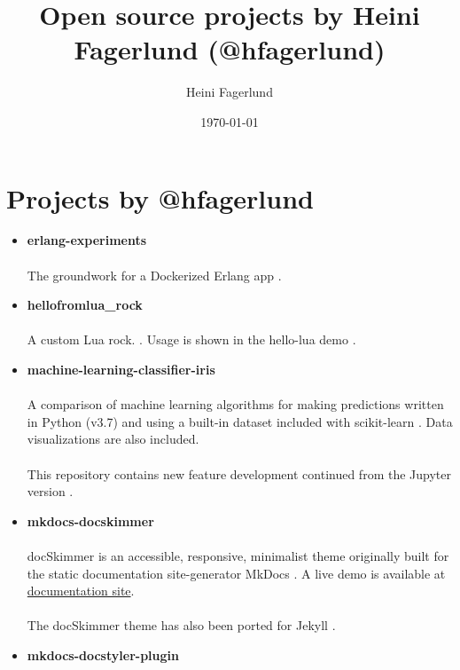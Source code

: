 \documentclass[11pt]{article}
\author{Heini Fagerlund}
\date{\today}
\title{Open source projects by Heini Fagerlund (@hfagerlund)}
\begin{document}
\maketitle

\section{Projects by @hfagerlund}
\label{sec:orgf2749c5}
\begin{itemize}
\item \textbf{erlang-experiments}
\paragraph{}
The groundwork for a Dockerized Erlang app \cite{erlang}.
\item \textbf{hellofromlua\_rock}
\paragraph{}
A custom Lua rock. \cite{luarock}. Usage is shown in the hello-lua demo \cite{lua}.
\item \textbf{machine-learning-classifier-iris}
\paragraph{}
A comparison of machine learning algorithms for making predictions written in Python (v3.7) and using a built-in dataset included with scikit-learn \cite{machinelearning}. Data visualizations are also included.
 \paragraph{}
This repository contains new feature development continued from the Jupyter version \cite{jupyter}.
\item \textbf{mkdocs-docskimmer}
\paragraph{}
docSkimmer is an accessible, responsive, minimalist theme originally built for the static documentation site-generator MkDocs \cite{mkdocs-docskimmer}. A live demo is available at \href{http://bitsof.bytesofdesign.com/mkdocs-docskimmer/}{documentation site}.
\paragraph{}
The docSkimmer theme has also been ported for Jekyll \cite{jekyll-docskimmer}.
\item \textbf{mkdocs-docstyler-plugin}

\end{itemize}
\end{document}
